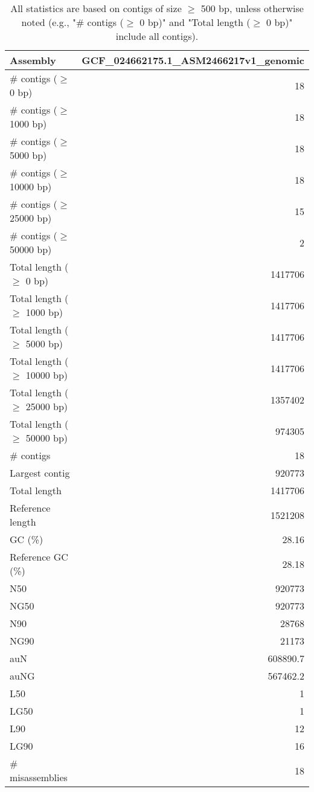 \documentclass[12pt,a4paper]{article}
\begin{document}
\begin{table}[ht]
\begin{center}
\caption{All statistics are based on contigs of size $\geq$ 500 bp, unless otherwise noted (e.g., "\# contigs ($\geq$ 0 bp)" and "Total length ($\geq$ 0 bp)" include all contigs).}
\begin{tabular}{|l*{1}{|r}|}
\hline
Assembly & GCF\_024662175.1\_ASM2466217v1\_genomic \\ \hline
\# contigs ($\geq$ 0 bp) & 18 \\ \hline
\# contigs ($\geq$ 1000 bp) & 18 \\ \hline
\# contigs ($\geq$ 5000 bp) & 18 \\ \hline
\# contigs ($\geq$ 10000 bp) & 18 \\ \hline
\# contigs ($\geq$ 25000 bp) & 15 \\ \hline
\# contigs ($\geq$ 50000 bp) & 2 \\ \hline
Total length ($\geq$ 0 bp) & 1417706 \\ \hline
Total length ($\geq$ 1000 bp) & 1417706 \\ \hline
Total length ($\geq$ 5000 bp) & 1417706 \\ \hline
Total length ($\geq$ 10000 bp) & 1417706 \\ \hline
Total length ($\geq$ 25000 bp) & 1357402 \\ \hline
Total length ($\geq$ 50000 bp) & 974305 \\ \hline
\# contigs & 18 \\ \hline
Largest contig & 920773 \\ \hline
Total length & 1417706 \\ \hline
Reference length & 1521208 \\ \hline
GC (\%) & 28.16 \\ \hline
Reference GC (\%) & 28.18 \\ \hline
N50 & 920773 \\ \hline
NG50 & 920773 \\ \hline
N90 & 28768 \\ \hline
NG90 & 21173 \\ \hline
auN & 608890.7 \\ \hline
auNG & 567462.2 \\ \hline
L50 & 1 \\ \hline
LG50 & 1 \\ \hline
L90 & 12 \\ \hline
LG90 & 16 \\ \hline
\# misassemblies & 18 \\ \hline

\end{tabular}
\end{center}
\end{table}
\end{document}
